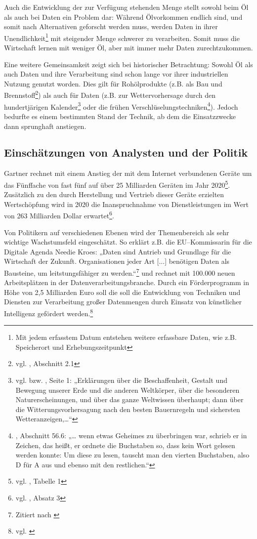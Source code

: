 Auch die Entwicklung der zur Verfügung stehenden Menge stellt sowohl beim Öl als auch bei Daten ein Problem dar: Während Ölvorkommen endlich sind, und somit nach Alternativen geforscht werden muss, werden Daten in ihrer Unendlichkeit\footnote{Mit jedem erfasstem Datum entstehen weitere erfassbare Daten, wie z.B. Speicherort und Erhebungszeitpunkt} mit steigender Menge schwerer zu verarbeiten. Somit muss die Wirtschaft lernen mit weniger Öl, aber mit immer mehr Daten zurechtzukommen.

Eine weitere Gemeinsamkeit zeigt sich bei historischer Betrachtung: Sowohl Öl als auch Daten und ihre Verarbeitung sind schon lange vor ihrer industriellen Nutzung genutzt worden. Dies gilt für Rohölprodukte (z.B. als Bau und Brennstoff\footnote{vgl. \cite{pressler}, Abschnitt 2.1}) als auch für Daten (z.B. zur Wettervorhersage durch den hundertjärigen Kalender\footnote{vgl. \cite{dwd} bzw. \cite{knauer100}, Seite 1: „Erklärungen über die Beschaffenheit, Gestalt und Bewegung unserer Erde und die anderen Weltkörper, über die besonderen Naturerscheinungen, und über das ganze Weltwissen überhaupt; dann über die Witterungsvorhersagung nach den besten Bauernregeln und sichersten Wetteranzeigen,…“} oder die frühen Verschlüselungstechniken\footnote{\cite{suetonius}, Abschnitt 56.6: „… wenn etwas Geheimes zu überbringen war, schrieb er in Zeichen, das heißt, er ordnete die Buchstaben so, dass kein Wort gelesen werden konnte: Um diese zu lesen, tauscht man den vierten Buchstaben, also D für A aus und ebenso mit den restlichen.“}). Jedoch bedurfte es einem bestimmten Stand der Technik, ab dem die Einsatzzwecke dann sprunghaft anstiegen.

\subsection{Einschätzungen von Analysten und der Politik}
\label{politik}

Gartner rechnet mit einem Anstieg der mit dem Internet verbundenen Geräte um das Fünffache  von fast fünf auf über 25 Milliarden Geräten im Jahr 2020\footnote{vgl. \cite{gartneriot}, Tabelle 1}. Zusätzlich zu den durch Herstellung und Vertrieb dieser Geräte erzielten Wertschöpfung wird in 2020 die Inanspruchnahme von Dienstleistungen im Wert von 263 Milliarden Dollar erwartet\footnote{vgl. \cite{gartneriot}, Absatz 3}.

Von Politikern auf verschiedenen Ebenen wird der Themenbereich  als sehr wichtige Wachstumsfeld eingeschätzt. So erklärt z.B. die EU--Kommissarin für die Digitale Agenda Needie Kroes: „Daten sind Antrieb und Grundlage für die Wirtschaft der Zukunft. Organisationen jeder Art [...] benötigen Daten als Bausteine, um leitstungsfähiger zu werden.“\footnote{Zitiert nach \cite{bd25}} und rechnet mit 100.000 neuen Arbeitsplätzen in der Datenverarbeitungsbranche. Durch ein Förderprogramm in Höhe von 2,5 Milliarden Euro soll die soll die Entwicklung von Techniken und Diensten zur Verarbeitung großer Datenmengen durch Einsatz von künstlicher Intelligenz gefördert werden.\footnote{vgl. \cite{bd25}}

